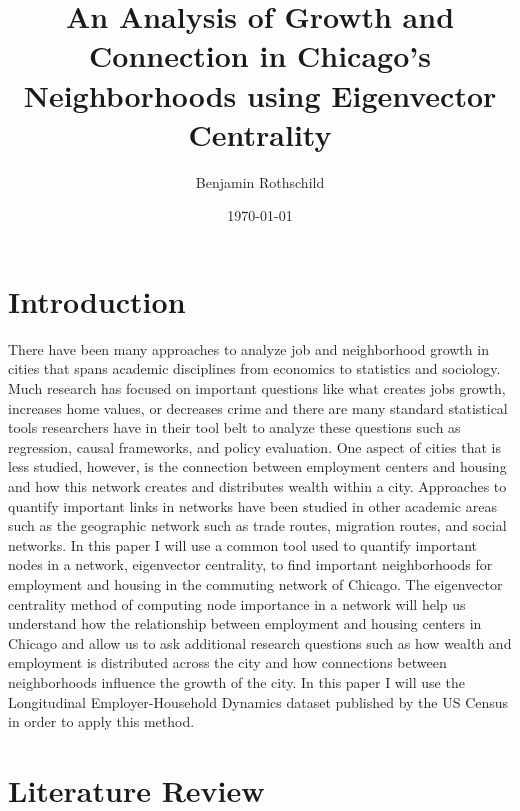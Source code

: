 \documentclass{article}
\title{An Analysis of Growth and Connection in Chicago’s Neighborhoods using Eigenvector Centrality}
\author{Benjamin Rothschild}
\date{\today}
\theoremstyle{definition}
\theoremstyle{remark}
\begin{document}
\begin{titlepage}
\maketitle
\thispagestyle{empty}

\end{titlepage}

\section{Introduction}
 
There have been many approaches to analyze job and neighborhood growth in cities that spans academic disciplines from economics to statistics and sociology.  Much research has focused on important questions like what creates jobs growth, increases home values, or decreases crime and there are many standard statistical tools researchers have in their tool belt to analyze these questions such as regression, causal frameworks, and policy evaluation.  One aspect of cities that is less studied, however, is the connection between employment centers and housing and how this network creates and distributes wealth within a city.  Approaches to quantify important links in networks have been studied in other academic areas such as the geographic network such as trade routes, migration routes, and social networks.  In this paper I will use a common tool used to quantify important nodes in a network, eigenvector centrality, to find important neighborhoods for employment and housing in the commuting network of Chicago.  The eigenvector centrality method of computing node importance in a network will help us understand how the relationship between employment and housing centers in Chicago and allow us to ask additional research questions such as how wealth and employment is distributed across the city and how connections between neighborhoods influence the growth of the city.  In this paper I will use the Longitudinal Employer-Household Dynamics dataset published by the US Census in order to apply this method.

\section{Literature Review}
\end{document}
